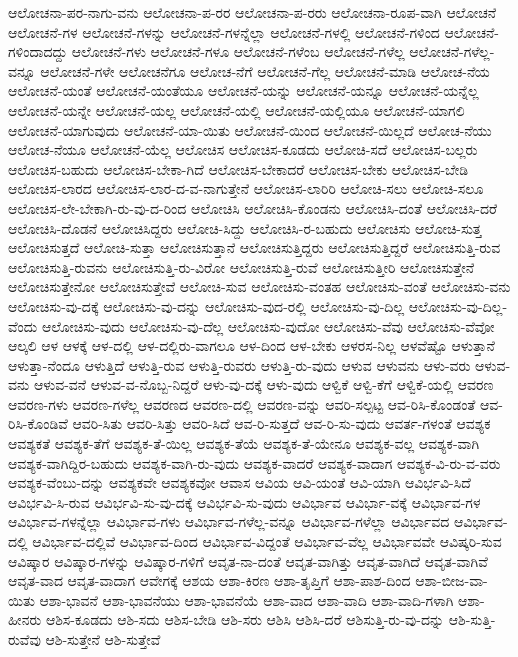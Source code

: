 {ಆಲೋಚನಾ-ಪರ-ನಾಗು-ವನು
ಆಲೋಚನಾ-ಪ-ರರ
ಆಲೋಚನಾ-ಪ-ರರು
ಆಲೋಚನಾ-ರೂಪ-ವಾಗಿ
ಆಲೋಚನೆ
ಆಲೋಚನೆ-ಗಳ
ಆಲೋಚನೆ-ಗಳನ್ನು
ಆಲೋಚನೆ-ಗಳನ್ನೆಲ್ಲಾ
ಆಲೋಚನೆ-ಗಳಲ್ಲಿ
ಆಲೋಚನೆ-ಗಳಿಂದ
ಆಲೋಚನೆ-ಗಳಿಂದಾದದ್ದು
ಆಲೋಚನೆ-ಗಳು
ಆಲೋಚನೆ-ಗಳೂ
ಆಲೋಚನೆ-ಗಳೆಂಬ
ಆಲೋಚನೆ-ಗಳೆಲ್ಲ
ಆಲೋಚನೆ-ಗಳೆಲ್ಲ-ವನ್ನೂ
ಆಲೋಚನೆ-ಗಳೇ
ಆಲೋಚನೆಗೂ
ಆಲೋಚ-ನೆಗೆ
ಆಲೋಚನೆ-ಗೆಲ್ಲ
ಆಲೋಚನೆ-ಮಾಡಿ
ಆಲೋಚ-ನೆಯ
ಆಲೋಚನೆ-ಯಂತೆ
ಆಲೋಚನೆ-ಯಂತೆಯೂ
ಆಲೋಚನೆ-ಯನ್ನು
ಆಲೋಚನೆ-ಯನ್ನೂ
ಆಲೋಚನೆ-ಯನ್ನೆಲ್ಲ
ಆಲೋಚನೆ-ಯನ್ನೇ
ಆಲೋಚನೆ-ಯಲ್ಲ
ಆಲೋಚನೆ-ಯಲ್ಲಿ
ಆಲೋಚನೆ-ಯಲ್ಲಿಯೂ
ಆಲೋಚನೆ-ಯಾಗಲಿ
ಆಲೋಚನೆ-ಯಾಗುವುದು
ಆಲೋಚನೆ-ಯಾ-ಯಿತು
ಆಲೋಚನೆ-ಯಿಂದ
ಆಲೋಚನೆ-ಯಿಲ್ಲದೆ
ಆಲೋಚ-ನೆಯು
ಆಲೋಚ-ನೆಯೂ
ಆಲೋಚನೆ-ಯೆಲ್ಲ
ಆಲೋಚಿಸ
ಆಲೋಚಿಸ-ಕೂಡದು
ಆಲೋಚಿ-ಸದೆ
ಆಲೋಚಿಸ-ಬಲ್ಲರು
ಆಲೋಚಿಸ-ಬಹುದು
ಆಲೋಚಿಸ-ಬೇಕಾ-ಗಿದೆ
ಆಲೋಚಿಸ-ಬೇಕಾದರೆ
ಆಲೋಚಿಸ-ಬೇಕು
ಆಲೋಚಿಸ-ಬೇಡಿ
ಆಲೋಚಿಸ-ಲಾರದ
ಆಲೋಚಿಸ-ಲಾರ-ದ-ವ-ನಾಗುತ್ತೇನೆ
ಆಲೋಚಿಸ-ಲಾರಿರಿ
ಆಲೋಚಿ-ಸಲು
ಆಲೋಚಿ-ಸಲೂ
ಆಲೋಚಿಸ-ಲೇ-ಬೇಕಾಗಿ-ರು-ವು-ದ-ರಿಂದ
ಆಲೋಚಿಸಿ
ಆಲೋಚಿಸಿ-ಕೊಂಡನು
ಆಲೋಚಿಸಿ-ದಂತೆ
ಆಲೋಚಿಸಿ-ದರೆ
ಆಲೋಚಿಸಿ-ದೊಡನೆ
ಆಲೋಚಿಸಿದ್ದರು
ಆಲೋಚಿ-ಸಿದ್ದು
ಆಲೋಚಿಸಿ-ರ-ಬಹುದು
ಆಲೋಚಿಸು
ಆಲೋಚಿ-ಸುತ್ತ
ಆಲೋಚಿಸುತ್ತದೆ
ಆಲೋಚಿ-ಸುತ್ತಾ
ಆಲೋಚಿಸುತ್ತಾನೆ
ಆಲೋಚಿಸುತ್ತಿದ್ದರು
ಆಲೋಚಿಸುತ್ತಿದ್ದರೆ
ಆಲೋಚಿಸುತ್ತಿ-ರುವ
ಆಲೋಚಿಸುತ್ತಿ-ರುವನು
ಆಲೋಚಿಸುತ್ತಿ-ರು-ವಿರೋ
ಆಲೋಚಿಸುತ್ತಿ-ರುವೆ
ಆಲೋಚಿಸುತ್ತೀರಿ
ಆಲೋಚಿಸುತ್ತೇನೆ
ಆಲೋಚಿಸುತ್ತೇನೋ
ಆಲೋಚಿಸುತ್ತೇವೆ
ಆಲೋಚಿ-ಸುವ
ಆಲೋಚಿಸು-ವಂತಹ
ಆಲೋಚಿಸು-ವಂತೆ
ಆಲೋಚಿಸು-ವನು
ಆಲೋಚಿಸು-ವು-ದಕ್ಕೆ
ಆಲೋಚಿಸು-ವು-ದನ್ನು
ಆಲೋಚಿಸು-ವುದ-ರಲ್ಲಿ
ಆಲೋಚಿಸು-ವು-ದಿಲ್ಲ
ಆಲೋಚಿಸು-ವು-ದಿಲ್ಲ-ವೆಂದು
ಆಲೋಚಿಸು-ವುದು
ಆಲೋಚಿಸು-ವು-ದೆಲ್ಲ
ಆಲೋಚಿಸು-ವುದೋ
ಆಲೋಚಿಸು-ವೆವು
ಆಲೋಚಿಸು-ವೆವೋ
ಆಲ್ಕಲಿ
ಆಳ
ಆಳಕ್ಕೆ
ಆಳ-ದಲ್ಲಿ
ಆಳ-ದಲ್ಲಿರು-ವಾಗಲೂ
ಆಳ-ದಿಂದ
ಆಳ-ಬೇಕು
ಆಳರಸ-ನಿಲ್ಲ
ಆಳವೆಷ್ಟೊ
ಆಳುತ್ತಾನೆ
ಆಳುತ್ತಾ-ನೆಂದೂ
ಆಳುತ್ತಿದೆ
ಆಳುತ್ತಿ-ರುವ
ಆಳುತ್ತಿ-ರುವರು
ಆಳುತ್ತಿ-ರು-ವುದು
ಆಳುವ
ಆಳುವನು
ಆಳು-ವರು
ಆಳುವ-ವನು
ಆಳುವ-ವನೆ
ಆಳುವ-ವ-ನೊಬ್ಬ-ನಿದ್ದರೆ
ಆಳು-ವು-ದಕ್ಕೆ
ಆಳು-ವುದು
ಆಳ್ವಿಕೆ
ಆಳ್ವಿ-ಕೆಗೆ
ಆಳ್ವಿಕೆ-ಯಲ್ಲಿ
ಆವರಣ
ಆವರಣ-ಗಳು
ಆವರಣ-ಗಳೆಲ್ಲ
ಆವರಣದ
ಆವರಣ-ದಲ್ಲಿ
ಆವರಣ-ವನ್ನು
ಆವರಿ-ಸಲ್ಪಟ್ಟ
ಆವ-ರಿಸಿ-ಕೊಂಡಂತೆ
ಆವ-ರಿಸಿ-ಕೊಂಡಿವೆ
ಆವರಿ-ಸಿತು
ಆವರಿ-ಸಿತ್ತು
ಆವರಿ-ಸಿದೆ
ಆವ-ರಿ-ಸುತ್ತದೆ
ಆವ-ರಿ-ಸು-ವುದು
ಆವರ್ತ-ಗಳಂತೆ
ಆವಶ್ಯಕ
ಆವಶ್ಯಕತೆ
ಆವಶ್ಯಕ-ತೆಗೆ
ಆವಶ್ಯಕ-ತೆ-ಯಿಲ್ಲ
ಆವಶ್ಯಕ-ತೆಯೆ
ಆವಶ್ಯಕ-ತೆ-ಯೇನೂ
ಆವಶ್ಯಕ-ವಲ್ಲ
ಆವಶ್ಯಕ-ವಾಗಿ
ಆವಶ್ಯಕ-ವಾಗಿದ್ದಿರ-ಬಹುದು
ಆವಶ್ಯಕ-ವಾಗಿ-ರು-ವುದು
ಆವಶ್ಯಕ-ವಾದರೆ
ಆವಶ್ಯಕ-ವಾದಾಗ
ಆವಶ್ಯಕ-ವಿ-ರು-ವ-ವರು
ಆವಶ್ಯಕ-ವೆಂಬು-ದನ್ನು
ಆವಶ್ಯಕವೇ
ಆವಶ್ಯಕವೋ
ಆವಾಸ
ಆವಿಯ
ಆವಿ-ಯಂತೆ
ಆವಿ-ಯಾಗಿ
ಆವಿರ್ಭವಿ-ಸಿದೆ
ಆವಿರ್ಭವಿ-ಸಿ-ರುವ
ಆವಿರ್ಭವಿ-ಸು-ವು-ದಕ್ಕೆ
ಆವಿರ್ಭವಿ-ಸು-ವುದು
ಆವಿರ್ಭಾವ
ಆವಿರ್ಭಾ-ವಕ್ಕೆ
ಆವಿರ್ಭಾವ-ಗಳ
ಆವಿರ್ಭಾವ-ಗಳನ್ನೆಲ್ಲಾ
ಆವಿರ್ಭಾವ-ಗಳು
ಆವಿರ್ಭಾವ-ಗಳೆಲ್ಲ-ವನ್ನೂ
ಆವಿರ್ಭಾವ-ಗಳೆಲ್ಲಾ
ಆವಿರ್ಭಾವದ
ಆವಿರ್ಭಾವ-ದಲ್ಲಿ
ಆವಿರ್ಭಾವ-ದಲ್ಲಿವೆ
ಆವಿರ್ಭಾವ-ದಿಂದ
ಆವಿರ್ಭಾವ-ವಿದ್ದಂತೆ
ಆವಿರ್ಭಾವ-ವೆಲ್ಲ
ಆವಿರ್ಭಾವವೇ
ಆವಿಷ್ಕರಿ-ಸುವ
ಆವಿಷ್ಕಾರ
ಆವಿಷ್ಕಾರ-ಗಳನ್ನು
ಆವಿಷ್ಕಾರ-ಗಳಿಗೆ
ಆವೃತ-ನಾ-ದಂತೆ
ಆವೃತ-ವಾಗಿತ್ತು
ಆವೃತ-ವಾಗಿದೆ
ಆವೃತ-ವಾಗಿವೆ
ಆವೃತ-ವಾದ
ಆವೃತ-ವಾದಾಗ
ಆವೇಗಕ್ಕೆ
ಆಶಯ
ಆಶಾ-ಕಿರಣ
ಆಶಾ-ತೃಪ್ತಿಗೆ
ಆಶಾ-ಪಾಶ-ದಿಂದ
ಆಶಾ-ಬೀಜ-ವಾ-ಯಿತು
ಆಶಾ-ಭಾವನೆ
ಆಶಾ-ಭಾವನೆಯು
ಆಶಾ-ಭಾವನೆಯೆ
ಆಶಾ-ವಾದ
ಆಶಾ-ವಾದಿ
ಆಶಾ-ವಾದಿ-ಗಳಾಗಿ
ಆಶಾ-ಹೀನರು
ಆಶಿಸ-ಕೂಡದು
ಆಶಿ-ಸದು
ಆಶಿಸ-ಬೇಡಿ
ಆಶಿ-ಸರು
ಆಶಿಸಿ
ಆಶಿಸಿ-ದರೆ
ಆಶಿಸುತ್ತಿ-ರು-ವು-ದನ್ನು
ಆಶಿ-ಸುತ್ತಿ-ರುವೆವು
ಆಶಿ-ಸುತ್ತೇನೆ
ಆಶಿ-ಸುತ್ತೇವೆ
}
